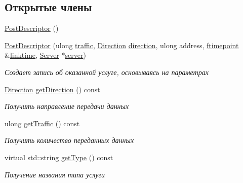 \subsection*{Открытые члены}
\begin{DoxyCompactItemize}
\item 
\hyperlink{class_network_service_1_1_post_descriptor_a8a374cfb3a42e16c9f0125509603801a}{Post\+Descriptor} ()
\item 
\hyperlink{class_network_service_1_1_post_descriptor_ac888b36a88d706220479595328e8f2cb}{Post\+Descriptor} (ulong \hyperlink{class_network_service_1_1_post_descriptor_ae2eef559828a42ec299ab59711f88e59}{traffic}, \hyperlink{namespace_network_service_abe1196dad9e8afcbc5c6b38196ce2c65}{Direction} \hyperlink{class_network_service_1_1_post_descriptor_a04faf66e747b2d4f2d89bf1e92f4ab5c}{direction}, ulong address, \hyperlink{networkservice_8h_ac877dfabb0f4f6a8184aa821b447e81d}{ftimepoint} \&\hyperlink{class_network_service_1_1_service_descriptor_a08bfd17afce0cba1954d30bd76a14df4}{linktime}, \hyperlink{class_network_service_1_1_server}{Server} $\ast$\hyperlink{class_network_service_1_1_service_descriptor_ad504b32ced44a75e0e02ea961d9434c4}{server})
\begin{DoxyCompactList}\small\item\em Создает запись об оказанной услуге, основываясь на параметрах \end{DoxyCompactList}\item 
\hyperlink{namespace_network_service_abe1196dad9e8afcbc5c6b38196ce2c65}{Direction} \hyperlink{class_network_service_1_1_post_descriptor_a09d005d77c03866e7875f4df0dcffad2}{get\+Direction} () const 
\begin{DoxyCompactList}\small\item\em Получить направление передачи данных \end{DoxyCompactList}\item 
ulong \hyperlink{class_network_service_1_1_post_descriptor_a3b859050d7ca47084a751b2be4da192c}{get\+Traffic} () const 
\begin{DoxyCompactList}\small\item\em Получить количество переданных данных \end{DoxyCompactList}\item 
virtual std\+::string \hyperlink{class_network_service_1_1_post_descriptor_a91b6330d604d4866c85c32187f131431}{get\+Type} () const 
\begin{DoxyCompactList}\small\item\em Получение названия типа услуги \end{DoxyCompactList}\item 

\end{DoxyCompactItemize}
